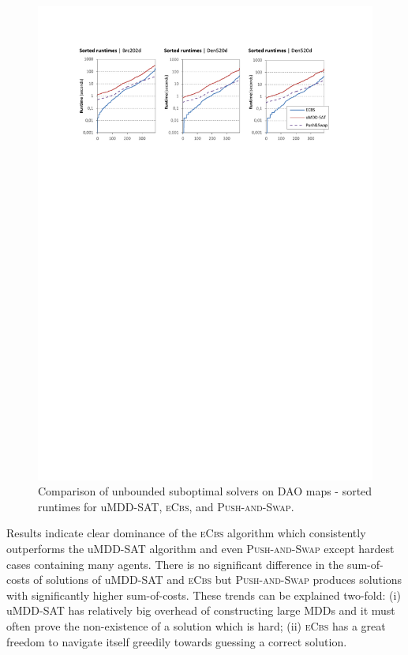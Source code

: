 \documentclass[jair,oneside,11pt]{article}
\begin{document}
\begin{figure}[h]
\centering
\includegraphics[trim={2.5cm 21.0cm 2.5cm 2.5cm},clip,width=\textwidth]{expr-sub_maps-U-sorted.pdf}
\vspace{-0.8cm}
\caption{Comparison of unbounded suboptimal solvers on DAO maps - sorted runtimes for uMDD-SAT, \textsc{eCbs}, and \textsc{Push-and-Swap}.}
\label{expr-sub_maps-U-sorted}
\end{figure}

Results indicate clear dominance of the \textsc{eCbs} algorithm which consistently outperforms the uMDD-SAT algorithm and even \textsc{Push-and-Swap} except hardest cases containing many agents. There is no significant difference in the sum-of-costs of solutions of uMDD-SAT and \textsc{eCbs} but  \textsc{Push-and-Swap} produces solutions with significantly higher sum-of-costs. These trends can be explained two-fold: (i) uMDD-SAT has relatively big overhead of constructing large MDDs and it must often prove the non-existence of a solution which is hard; (ii) \textsc{eCbs} has a great freedom to navigate itself greedily towards guessing a correct solution.
\end{document}
